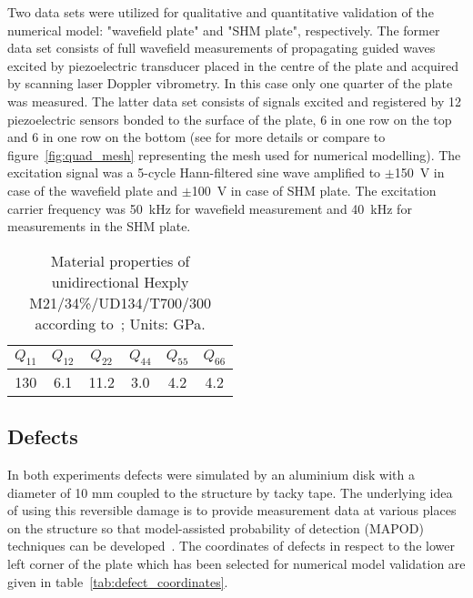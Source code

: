 \documentclass[12pt]{iopart}
\begin{document}
Two data sets were utilized for qualitative and quantitative validation of the numerical model: "wavefield plate" and "SHM plate", respectively. The former data set consists of full wavefield measurements of propagating guided waves excited by piezoelectric transducer placed in the centre of the plate and acquired by scanning laser Doppler vibrometry. In this case only one quarter of the plate was measured. The latter data set consists of signals excited and registered by 12 piezoelectric sensors bonded to the surface of the plate, 6 in one row on the top and 6 in one row on the bottom (see \cite{Moll2018} for more details or compare to figure~\ref{fig:quad_mesh} representing the mesh used for numerical modelling). The excitation signal was a 5-cycle Hann-filtered sine wave amplified to \(\pm\)150~V in case of the wavefield plate and  \(\pm\)100~V in case of SHM plate. The excitation carrier frequency was 50~kHz for wavefield measurement and 40~kHz for measurements in the SHM plate.
\begin{table}
	\caption{Material properties of unidirectional Hexply M21/34\%/UD134/T700/300 according to~\cite{Moll2018}; Units: GPa.}
	\begin{indented}
	\item[]	\begin{tabular}{cccccc} 
		\toprule
		\(Q_{11}\) & \(Q_{12}\)  & \(Q_{22}\) & \(Q_{44}\) & \(Q_{55}\) & \(Q_{66}\)\\
		\midrule
		130& 6.1& 11.2 & 3.0 & 4.2 & 4.2\\
		\bottomrule 
	\end{tabular} 
	\label{tab:mat_prop}
	\end{indented}
\end{table}

\subsection{Defects}
In both experiments defects were simulated by an aluminium disk with a diameter of 10 mm coupled to the structure by tacky tape. The underlying idea of using this reversible damage is to provide measurement data at various places on the structure so that model-assisted probability of detection (MAPOD) techniques can be developed~\cite{Eckstein2012}. The coordinates of defects in respect to the lower left corner of the plate which has been selected for numerical model validation are given in table~\ref{tab:defect_coordinates}.
\end{document}
